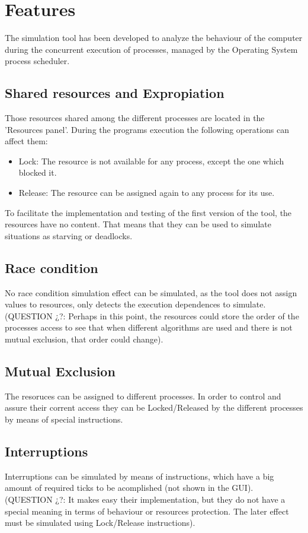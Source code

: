 \documentclass{report}
\begin{document}
    \section{Features}
        The simulation tool has been developed to analyze the behaviour of the computer during the concurrent execution of processes, managed by the Operating System process scheduler.\\
        \subsection{Shared resources and Expropiation}
            Those resources shared among the different processes are located in the 'Resources panel'. During the programs execution the following operations can affect them:
            \begin{itemize}
                \item Lock: The resource is not available for any process, except the one which blocked it.
                \item Release: The resource can be assigned again to any process for its use.
            \end{itemize}
            To facilitate the implementation and testing of the first version of the tool, the resources have no content. That means that they can be used to simulate situations as starving or deadlocks.
        \subsection{Race condition}
            No race condition simulation effect can be simulated, as the tool does not assign values to resources, only detects the execution dependences to simulate.\\
            (QUESTION ¿?: Perhaps in this point, the resources could store the order of the processes access to see that when different algorithms are used and there is not mutual exclusion, that order could change).            
        \subsection{Mutual Exclusion}
            The resoruces can be assigned to different processes. In order to control and assure their corrent access they can be Locked/Released by the different processes by means of special instructions.
        \subsection{Interruptions}
            Interruptions can be simulated by means of instructions, which have a big amount of required ticks to be acomplished (not shown in the GUI).\\
            (QUESTION ¿?: It makes easy their implementation, but they do not have a special meaning in terms of behaviour or resources protection. The later effect must be simulated using Lock/Release instructions).
\end{document}
